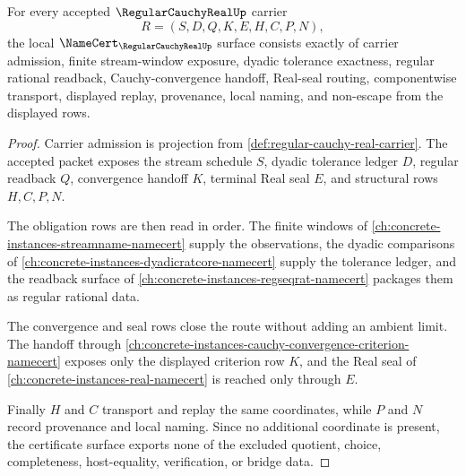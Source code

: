 \begin{theorem}
\label{thm:regular-cauchy-real-namecert-obligations}
For every accepted $\RegularCauchyRealUp$ carrier
$$
R=(S,D,Q,K,E,H,C,P,N),
$$
the local $\NameCert_{\RegularCauchyRealUp}$ surface consists exactly of carrier admission, finite stream-window exposure, dyadic tolerance exactness, regular rational readback, Cauchy-convergence handoff, Real-seal routing, componentwise transport, displayed replay, provenance, local naming, and non-escape from the displayed rows.
\end{theorem}
\begin{proof}
Carrier admission is projection from \autoref{def:regular-cauchy-real-carrier}. The accepted packet exposes the stream schedule $S$, dyadic tolerance ledger $D$, regular readback $Q$, convergence handoff $K$, terminal Real seal $E$, and structural rows $H,C,P,N$.

The obligation rows are then read in order. The finite windows of \autoref{ch:concrete-instances-streamname-namecert} supply the observations, the dyadic comparisons of \autoref{ch:concrete-instances-dyadicratcore-namecert} supply the tolerance ledger, and the readback surface of \autoref{ch:concrete-instances-regseqrat-namecert} packages them as regular rational data.

The convergence and seal rows close the route without adding an ambient limit. The handoff through \autoref{ch:concrete-instances-cauchy-convergence-criterion-namecert} exposes only the displayed criterion row $K$, and the Real seal of \autoref{ch:concrete-instances-real-namecert} is reached only through $E$.

Finally $H$ and $C$ transport and replay the same coordinates, while $P$ and $N$ record provenance and local naming. Since no additional coordinate is present, the certificate surface exports none of the excluded quotient, choice, completeness, host-equality, verification, or bridge data.
\end{proof}

